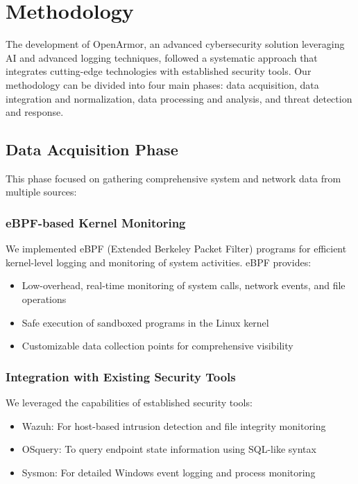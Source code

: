 \chapter{Methodology}

The development of OpenArmor, an advanced cybersecurity solution leveraging AI and advanced logging techniques, followed a systematic approach that integrates cutting-edge technologies with established security tools. Our methodology can be divided into four main phases: data acquisition, data integration and normalization, data processing and analysis, and threat detection and response.

\section{Data Acquisition Phase}

This phase focused on gathering comprehensive system and network data from multiple sources:

\subsection{eBPF-based Kernel Monitoring}
We implemented eBPF (Extended Berkeley Packet Filter) programs for efficient kernel-level logging and monitoring of system activities. eBPF provides:
\begin{itemize}
    \item Low-overhead, real-time monitoring of system calls, network events, and file operations
    \item Safe execution of sandboxed programs in the Linux kernel
    \item Customizable data collection points for comprehensive visibility
\end{itemize}

\subsection{Integration with Existing Security Tools}
We leveraged the capabilities of established security tools:
\begin{itemize}
    \item Wazuh: For host-based intrusion detection and file integrity monitoring
    \item OSquery: To query endpoint state information using SQL-like syntax
    \item Sysmon: For detailed Windows event logging and process monitoring
\end{itemize}

